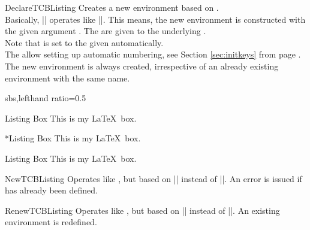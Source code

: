 \begin{docCommand}{DeclareTCBListing}{}
  Creates a new environment  based on .\\
  Basically, |\DeclareTCBListing| operates like |\DeclareDocumentEnvironment|. This means,
  the new environment  is constructed with the given argument .
  The  are given to the underlying .\\
  Note that  is set to the given 
  automatically.\\
  The  allow setting up automatic numbering,
  see Section \ref{sec:initkeys} from page \pageref{sec:initkeys}.\\
  The new environment is always created, irrespective of an already existing
  environment with the same name.

\begin{dispExample*}{sbs,lefthand ratio=0.5}

\begin{mybox}{Listing Box}
This is my
\LaTeX\ box.
\end{mybox}
\bigskip

\begin{mybox}*{Listing Box}
This is my
\LaTeX\ box.
\end{mybox}
\bigskip

\begin{mybox}[colback=yellow]
  {Listing Box}
This is my
\LaTeX\ box.
\end{mybox}
\end{dispExample*}
\end{docCommand}



\begin{docCommand}{NewTCBListing}{}
  Operates like , but based on |\NewDocumentEnvironment| instead of |\DeclareDocumentEnvironment|.
  An error is issued if  has already been defined.
\end{docCommand}

\begin{docCommand}{RenewTCBListing}{}
  Operates like , but based on |\RenewDocumentEnvironment| instead of |\DeclareDocumentEnvironment|.
  An existing environment is redefined.
\end{docCommand}

